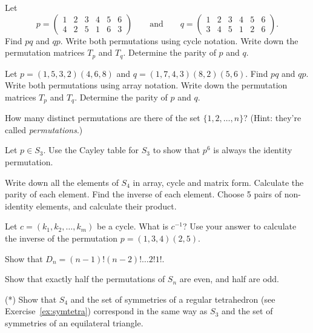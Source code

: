 \begin{exercises}
  \item Let
    \[
      p = \begin{pmatrix}
        1 & 2 & 3 & 4 & 5 & 6 \\
        4 & 2 & 5 & 1 & 6 & 3
      \end{pmatrix}
      \qquad \text{and} \qquad
      q = \begin{pmatrix}
        1 & 2 & 3 & 4 & 5 & 6 \\
        3 & 4 & 5 & 1 & 2 & 6
      \end{pmatrix}.
    \]
    Find $pq$ and $qp$.  Write both permutations using cycle notation.
    Write down the permutation matrices $T_{p}$ and $T_{q}$.
    Determine the parity of $p$ and $q$.
  
  \item Let $p = (1, 5, 3, 2)(4, 6, 8)$ and $q = (1, 7, 4, 3)(8, 2)(5, 6)$.
    Find $pq$ and $qp$.  Write both permutations using array notation.
    Write down the permutation matrices $T_{p}$ and $T_{q}$.
    Determine the parity of $p$ and $q$.

  \item How many distinct permutations are there of the set $\{1, 2,
    \ldots, n\}$? (Hint: they're called \emph{permutations}.)
  
  \item Let $p \in S_{3}$.  Use the Cayley table for $S_{3}$ to show that
    $p^{6}$ is always the identity permutation.
  
  \item Write down all the elements of $S_{4}$ in array, cycle and matrix form.
    Calculate the parity of each element.
    Find the inverse of each element.
    Choose 5 pairs of non-identity elements, and calculate their product.
  
  \item Let $c = (k_{1}, k_{2}, \ldots, k_{m})$ be a cycle.  What is $c^{-1}$?
    Use your answer to calculate the inverse of the permutation
    $p = (1,3,4)(2,5)$.
  
  \item Show that $D_{n} = (n-1)! (n-2)! \ldots 2! 1!$.
  
  \item Show that exactly half the permutations of $S_{n}$ are even, and half
    are odd.
  
  \item (*) Show that $S_{4}$ and the set of symmetries of a regular tetrahedron
    (see Exercise~\ref{ex:symtetra}) correspond
    in the same way as $S_{3}$ and the set of symmetries of an equilateral
    triangle.
    

\end{exercises}

